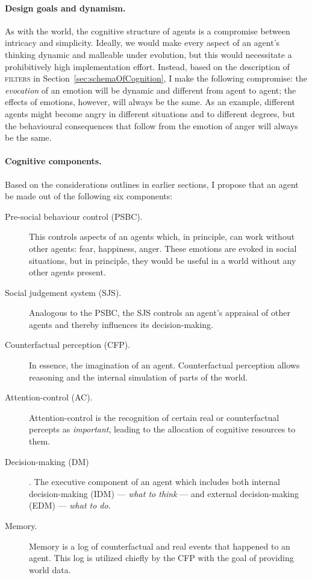 \paragraph{Design goals and dynamism.} As with the world, the cognitive structure of agents is a compromise between intricacy and simplicity. Ideally, we would make every aspect of an agent's thinking dynamic and malleable under evolution, but this would necessitate a prohibitively high implementation effort. Instead, based on the description of \textsc{filters} in Section~\ref{sec:schemaOfCognition}, I make the following compromise: the {\em evocation} of an emotion will be dynamic and different from agent to agent; the effects of emotions, however, will always be the same. As an example, different agents might become angry in different situations and to different degrees, but the behavioural consequences that follow from the emotion of anger will always be the same.

\paragraph{Cognitive components.} Based on the considerations outlines in earlier sections, I propose that an agent be made out of the following six components:

\begin{description}
	\item[Pre-social behaviour control (PSBC).] This controls aspects of an agents which, in principle, can work without other agents: fear, happiness, anger.  These emotions are evoked in social situations, but in principle, they would be useful in a world without any other agents present.
	\item[Social judgement system (SJS).] Analogous to the \textsc{PSBC}, the \textsc{SJS} controls an agent's appraisal of other agents and thereby influences its decision-making.
	\item[Counterfactual perception (CFP).] In essence, the imagination of an agent. Counterfactual perception allows reasoning and the internal simulation of parts of the world.
	\item[Attention-control (AC).] Attention-control is the recognition of certain real or counterfactual percepts as {\em important}, leading to the allocation of cognitive resources to them.
	\item[Decision-making (DM)]. The executive component of an agent which includes both internal decision-making (IDM) --- {\em what to think} --- and external decision-making (EDM) --- {\em what to do}.
	\item[Memory.] Memory is a log of counterfactual and real events that happened to an agent. This log is utilized chiefly by the \textsc{CFP} with the goal of providing world data.
\end{description}


